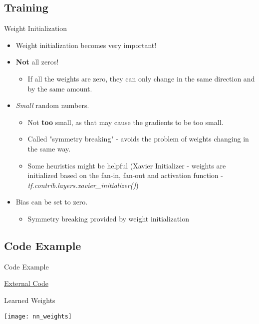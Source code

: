 \subsection{Training}
\begin{frame}{Weight Initialization}
	\begin{itemize}
		\item Weight initialization becomes very important!
		\item \textbf{Not} all zeros!
		      \begin{itemize}
		      	\item If all the weights are zero, they can only change in the same direction and by the same amount.
		      \end{itemize}
		\item \textit{Small} random numbers.
		      \begin{itemize}
		      	\item Not \textbf{too} small, as that may cause the gradients to be too small.
		      	\item Called "symmetry breaking" - avoids the problem of weights changing in the same way.
		      	\item Some heuristics might be helpful (Xavier Initializer - weights are initialized based on the fan-in, fan-out and activation function - \textit{tf.contrib.layers.xavier\_initializer()})
		      \end{itemize}
		\item Bias can be set to zero.
		      \begin{itemize}
		      	\item Symmetry breaking provided by weight initialization
		      \end{itemize}
	\end{itemize}
\end{frame}


\subsection{Code Example}
\begin{frame}{Code Example}
	\begin{center}
		\textcolor{blue!75}{\underline{ \href{https://github.com/davifrossard/iml/blob/master/04_LogRegAndNN/Sample_Code/Neural Network.py}{External Code}}}
	\end{center}
\end{frame}

\begin{frame}{Learned Weights}
	\begin{center}
		\texttt{[image: nn\_weights]}
	\end{center}
\end{frame}



